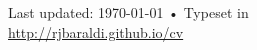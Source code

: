 \documentclass[10pt, a4paper]{article}
\begin{document}
\vfill{}

\begin{center}
{\scriptsize  Last updated: \today\- •\- 
Typeset in \href{http://nitens.org/taraborelli/cvtex}{
\XeTeX }\\
\href{http://rjbaraldi.github.io/cv}{http://rjbaraldi.github.io/cv}}
\end{center}
\end{document}
